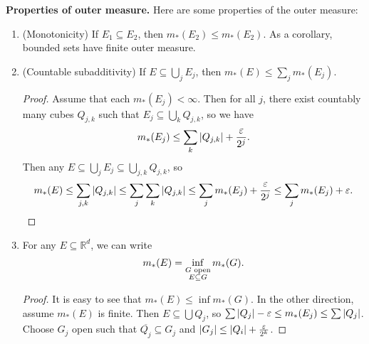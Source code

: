 \documentclass[leqno, openany]{memoir}
\theoremstyle{definition}
\theoremstyle{remark}
\theoremstyle{plain}
\theoremstyle{definition}
\theoremstyle{remark}
\newcommand{\R}{\mathbb{R}}
\newcommand{\ep}{\varepsilon}
\newcommand{\ol}[1]{\overline{#1}}
\begin{document}
\textbf{Properties of outer measure.} Here are some properties of the outer measure:
\begin{enumerate}
    \item (Monotonicity) If $E_1 \subseteq E_2$, then $m_*(E_2) \leq m_*(E_2)$. As a corollary, bounded sets have finite outer measure.
    \item (Countable subadditivity) If $E \subseteq \bigcup_j E_j$, then $m_*(E) \leq \sum_j m_*(E_j)$.
        \begin{proof}
            Assume that each $m_*(E_j) < \infty$. Then for all $j$, there exist countably many cubes $Q_{j,k}$ such that $E_j \subseteq \bigcup_k Q_{j,k}$, so we have
            \[ m_*(E_j) \leq \sum_k \abs{Q_{j,k}} + \frac{\ep}{2^j}. \]
            Then any $E \subseteq \bigcup_j E_j \subseteq \bigcup_{j,k} Q_{j,k}$, so
            \[ m_*(E) \leq \sum_{j,k} \abs{Q_{j,k}} \leq \sum_j \sum_k \abs{Q_{j,k}} \leq \sum_j m_*(E_j) + \frac{\ep}{2^j} \leq \sum_j m_*(E_j) + \ep. \qedhere \]
        \end{proof}
    \item For any $E \subseteq \R^d$, we can write 
        \[ m_*(E) = \inf_{\substack{G \text{ open}\\E \subseteq G}} m_*(G). \qedhere \]
        \begin{proof}
            It is easy to see that $m_*(E) \leq \inf m_*(G)$. In the other direction, assume $m_*(E)$ is finite. Then $E \subseteq \bigcup Q_j$, so $\sum \abs{Q_j} - \ep \leq m_*(E_j) \leq \sum \abs{Q_j}$. Choose $G_j$ open such that $\ol{Q_j} \subseteq G_j$ and $\abs{G_j} \leq \abs{Q_i} + \frac{\ep}{2^k}$. 


\end{proof}
\end{enumerate}
\end{document}
